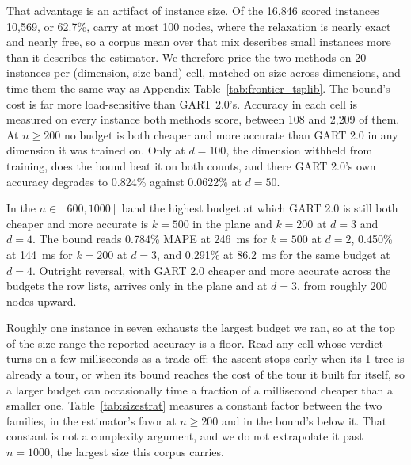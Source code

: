 \documentclass{article}
\begin{document}
That advantage is an artifact of instance size. Of the 16{,}846 scored instances 10{,}569, or 62.7\%, carry at most 100 nodes, where the relaxation is nearly exact and nearly free, so a corpus mean over that mix describes small instances more than it describes the estimator. We therefore price the two methods on 20 instances per (dimension, size band) cell, matched on size across dimensions, and time them the same way as Appendix Table~\ref{tab:frontier_tsplib}. The bound's cost is far more load-sensitive than GART 2.0's. Accuracy in each cell is measured on every instance both methods score, between 108 and 2{,}209 of them. At $n\ge200$ no budget is both cheaper and more accurate than GART 2.0 in any dimension it was trained on. Only at $d=100$, the dimension withheld from training, does the bound beat it on both counts, and there GART 2.0's own accuracy degrades to 0.824\% against 0.0622\% at $d=50$.

In the $n\in[600,1000]$ band the highest budget at which GART 2.0 is still both cheaper and more accurate is $k=500$ in the plane and $k=200$ at $d=3$ and $d=4$. The bound reads 0.784\% MAPE at 246~ms for $k=500$ at $d=2$, 0.450\% at 144~ms for $k=200$ at $d=3$, and 0.291\% at 86.2~ms for the same budget at $d=4$. Outright reversal, with GART 2.0 cheaper and more accurate across the budgets the row lists, arrives only in the plane and at $d=3$, from roughly 200 nodes upward.

Roughly one instance in seven exhausts the largest budget we ran, so at the top of the size range the reported accuracy is a floor. Read any cell whose verdict turns on a few milliseconds as a trade-off: the ascent stops early when its 1-tree is already a tour, or when its bound reaches the cost of the tour it built for itself, so a larger budget can occasionally time a fraction of a millisecond cheaper than a smaller one. Table~\ref{tab:sizestrat} measures a constant factor between the two families, in the estimator's favor at $n\ge200$ and in the bound's below it. That constant is not a complexity argument, and we do not extrapolate it past $n=1000$, the largest size this corpus carries.
\end{document}
